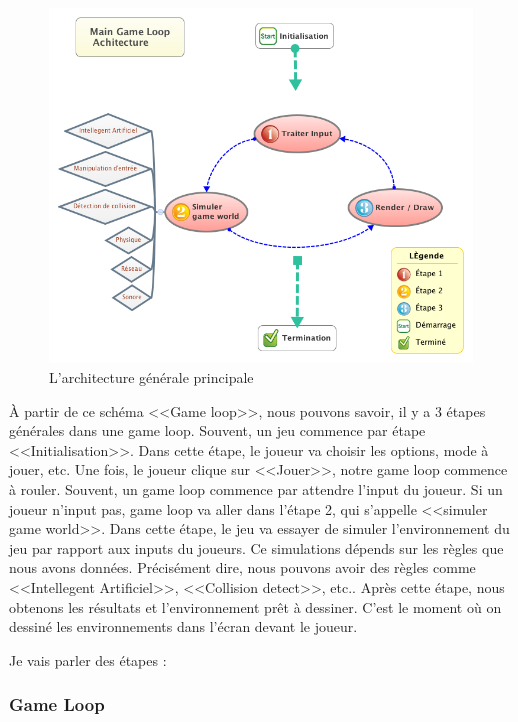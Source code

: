 \begin{figure}[htbp]
	\centering
		\includegraphics[width=6in]{XMinds/MainGameLoopAchitecture.png}
	\caption{L'architecture générale principale}
	\label{fig:XMinds_MainGameLoopAchitecture}
\end{figure}

À partir de ce schéma <<Game loop>>, nous pouvons savoir, il y a 3 étapes générales dans une game loop. Souvent, un jeu commence par étape <<Initialisation>>. Dans cette étape, le joueur va choisir les options, mode à jouer, etc. Une fois, le joueur clique sur <<Jouer>>, notre game loop commence à rouler. Souvent, un game loop commence par attendre l'input du joueur. Si un joueur n'input pas, game loop va aller dans l'étape 2, qui s'appelle <<simuler game world>>. Dans cette étape, le jeu va essayer de simuler l'environnement du jeu par rapport aux inputs du joueurs. Ce simulations dépends sur les règles que nous avons données. Précisément dire, nous pouvons avoir des règles comme <<Intellegent Artificiel>>, <<Collision detect>>, etc.. Après cette étape, nous obtenons les résultats et l'environnement prêt à dessiner. C'est le moment où on dessiné les environnements dans l'écran devant le joueur.

Je vais parler des étapes :

\subsubsection{Game Loop} %
\label{ssub:game_loop}

